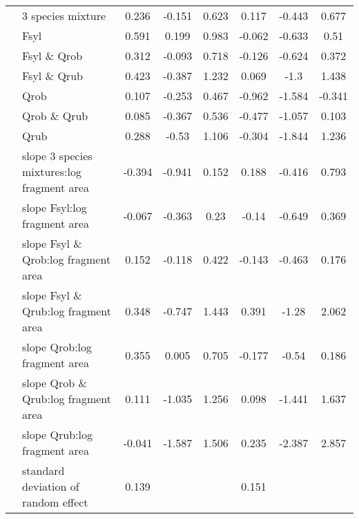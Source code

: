 \documentclass[10pt, twoside]{book} %
\begin{document}
\begin{landscape}
\begin{table}
\begin{center}
\begin{footnotesize}
\begin{tabular}{c l c c c c c c}
					& 3 species mixture & 0.236 & -0.151 & 0.623 & 	0.117 & -0.443 & 0.677\\
					& Fsyl & 0.591 & 0.199 & 0.983 & 	-0.062 & -0.633 & 0.51\\
					& Fsyl \& Qrob & 0.312 & -0.093 & 0.718 & 	-0.126 & -0.624 & 0.372\\
					& Fsyl \& Qrub & 0.423 & -0.387 & 1.232 & 	0.069 & -1.3 & 1.438\\
					& Qrob & 0.107 & -0.253 & 0.467 & 	-0.962 & -1.584 & -0.341\\
					& Qrob \& Qrub & 0.085 & -0.367 & 0.536 & 	-0.477 & -1.057 & 0.103\\
					& Qrub & 0.288 & -0.53 & 1.106 &  	-0.304 & -1.844 & 1.236\\
					\cline{2-8}
					\multirow{7}{*}{\rotatebox[origin=c]{90}{\parbox[c]{3cm}{\centering Slopes)}}} & slope 3 species mixtures:log fragment area & -0.394 & -0.941 & 0.152 & 	0.188 & -0.416 & 0.793\\
					& slope Fsyl:log fragment area & -0.067 & -0.363 & 0.23 & 	-0.14 & -0.649 & 0.369\\
					& slope Fsyl \& Qrob:log fragment area & 0.152 & -0.118 & 0.422 & 	-0.143 & -0.463 & 0.176\\
					& slope Fsyl \& Qrub:log fragment area & 0.348 & -0.747 & 1.443 & 	0.391 & -1.28 & 2.062\\
					& slope Qrob:log fragment area & 0.355 & 0.005 & 0.705 & 	-0.177 & -0.54 & 0.186\\
					& slope Qrob \& Qrub:log fragment area & 0.111 & -1.035 & 1.256 & 	0.098 & -1.441 & 1.637\\
					& slope Qrub:log fragment area & -0.041 & -1.587 & 1.506 &  	0.235 & -2.387 & 2.857\\
					\cline{2-8}
					
					& standard deviation of random effect& 	0.139&&& 0.151&&\\	
					\bottomrule
				\end{tabular}\endgroup
			\end{footnotesize}
		\end{center}
	\end{table}
\end{landscape}
\clearpage
\end{document}
